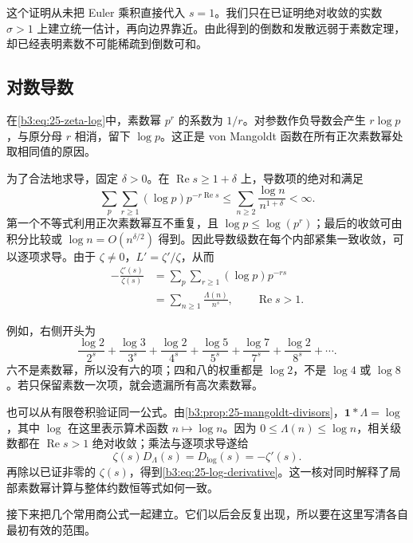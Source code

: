 这个证明从未把 Euler 乘积直接代入 \(s=1\)。我们只在已证明绝对收敛的实数 \(\sigma>1\) 上建立统一估计，再向边界靠近。由此得到的倒数和发散远弱于素数定理，却已经表明素数不可能稀疏到倒数可和。

\subsection{对数导数}
\label{b3:subsec:250504}

在\eqref{b3:eq:25-zeta-log}中，素数幂 \(p^r\) 的系数为 \(1/r\)。对参数作负导数会产生 \(r\log p\)，与原分母 \(r\) 相消，留下 \(\log p\)。这正是 von Mangoldt 函数在所有正次素数幂处取相同值的原因。

为了合法地求导，固定 \(\delta>0\)。在 \(\operatorname{Re}s\ge1+\delta\) 上，导数项的绝对和满足
\[
 \sum_p\sum_{r\ge1}(\log p)p^{-r\operatorname{Re}s}
 \le\sum_{n\ge2}\frac{\log n}{n^{1+\delta}}<\infty.
\]
第一个不等式利用正次素数幂互不重复，且 \(\log p\le\log(p^r)\)；最后的收敛可由积分比较或 \(\log n=O(n^{\delta/2})\) 得到。因此导数级数在每个内部紧集一致收敛，可以逐项求导。由于 \(\zeta\ne0\)，\(L'=\zeta'/\zeta\)，从而
\begin{equation}\label{b3:eq:25-log-derivative}
 \begin{aligned}
 -\frac{\zeta'(s)}{\zeta(s)}
 &=\sum_p\sum_{r\ge1}(\log p)p^{-rs}\\
 &=\sum_{n\ge1}\frac{\Lambda(n)}{n^s},
 \qquad \operatorname{Re}s>1.
 \end{aligned}
\end{equation}

例如，右侧开头为
\[
 \frac{\log2}{2^s}+\frac{\log3}{3^s}
 +\frac{\log2}{4^s}+\frac{\log5}{5^s}
 +\frac{\log7}{7^s}+\frac{\log2}{8^s}+\cdots.
\]
六不是素数幂，所以没有六的项；四和八的权重都是 \(\log2\)，不是 \(\log4\) 或 \(\log8\)。若只保留素数一次项，就会遗漏所有高次素数幂。

也可以从有限卷积验证同一公式。由\cref{b3:prop:25-mangoldt-divisors}，\(\mathbf1*\Lambda=\log\)，其中 \(\log\) 在这里表示算术函数 \(n\mapsto\log n\)。因为 \(0\le\Lambda(n)\le\log n\)，相关级数都在 \(\operatorname{Re}s>1\) 绝对收敛；乘法与逐项求导遂给
\[
 \zeta(s)D_\Lambda(s)=D_{\log}(s)=-\zeta'(s).
\]
再除以已证非零的 \(\zeta(s)\)，得到\eqref{b3:eq:25-log-derivative}。这一核对同时解释了局部素数幂计算与整体约数恒等式如何一致。

接下来把几个常用商公式一起建立。它们以后会反复出现，所以要在这里写清各自最初有效的范围。

